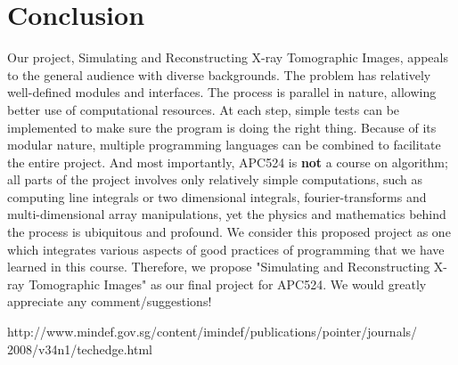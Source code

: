 \documentclass[11]{article}
\begin{document}
\section{Conclusion}
Our project, Simulating and Reconstructing X-ray Tomographic Images, appeals to the general audience with diverse backgrounds. The problem has relatively well-defined modules and interfaces. The process is parallel in nature, allowing better use of computational resources. At each step, simple tests can be implemented to make sure the program is doing the right thing. Because of its modular nature, multiple programming languages can be combined to facilitate the entire project. And most importantly, APC524 is \textbf{not} a course on algorithm; all parts of the project involves only relatively simple computations, such as computing line integrals or two dimensional integrals, fourier-transforms and multi-dimensional array manipulations, yet the physics and mathematics behind the process is ubiquitous and profound. We consider this proposed project as one which integrates various aspects of good practices of programming that we have learned in this course. Therefore, we propose "Simulating and Reconstructing X-ray Tomographic Images" as our final project for APC524. We would greatly appreciate any comment/suggestions! 

\begin{thebibliography}{9}
http://www.mindef.gov.sg/content/imindef/publications/pointer/journals/ 2008/v34n1/techedge.html
\end{thebibliography}
\end{document}
